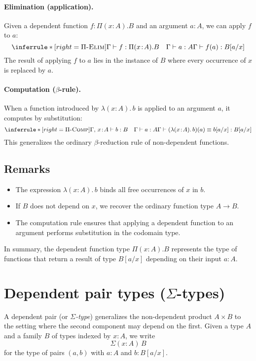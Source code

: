 \documentclass{article}
\newcommand{\judg}[3]{#1 \vdash #2 : #3}   %
\newcommand{\jdeq}{\equiv}                 %
\newcommand{\teq}[4]{#1 \vdash #2 \jdeq #3 : #4} %
\newcommand{\rulename}[1]{\textsc{#1}}
\begin{document}
\paragraph{Elimination (application).}
Given a dependent function \(f : \Pi(x\!:\!A).B\) and an argument \(a:A\),
we can apply \(f\) to \(a\):
\[
\inferrule*[right=\rulename{\(\Pi\)-Elim}]{
  \judg{\Gamma}{f}{\Pi(x\!:\!A).B}
  \quad
  \judg{\Gamma}{a}{A}
}{
  \judg{\Gamma}{f(a)}{B[a/x]}
}
\]
The result of applying \(f\) to \(a\) lies in the instance of \(B\)
where every occurrence of \(x\) is replaced by \(a\).

\paragraph{Computation (\(\beta\)-rule).}
When a function introduced by \(\lambda(x\!:\!A).\,b\) is applied to an argument \(a\),
it computes by substitution:
\[
\inferrule*[right=\rulename{\(\Pi\)-Comp}]{
  \judg{\Gamma,\,x\!:\!A}{b}{B}
  \quad
  \judg{\Gamma}{a}{A}
}{
  \teq{\Gamma}{(\lambda(x\!:\!A).\,b)(a)}{b[a/x]}{B[a/x]}
}
\]
This generalizes the ordinary \(\beta\)-reduction rule of non-dependent functions.

\subsection*{Remarks}

\begin{itemize}
  \item The expression \(\lambda(x\!:\!A).\,b\) binds all free occurrences of \(x\) in \(b\).
  \item If \(B\) does not depend on \(x\), we recover the ordinary function type \(A \to B\).
  \item The computation rule ensures that applying a dependent function
        to an argument performs substitution in the codomain type.
\end{itemize}

In summary, the dependent function type \(\Pi(x\!:\!A).B\)
represents the type of functions that return a result of type \(B[a/x]\)
depending on their input \(a:A\).

\section{Dependent pair types (\texorpdfstring{$\Sigma$}{Sigma}-types)}

A dependent pair (or \emph{$\Sigma$-type}) generalizes the non-dependent product
\(A \times B\) to the setting where the second component may depend on the first.
Given a type \(A\) and a family \(B\) of types indexed by \(x:A\), we write
\[
\Sigma(x\!:\!A)\,B
\]
for the type of pairs \((a,b)\) with \(a:A\) and \(b:B[a/x]\).
\end{document}
